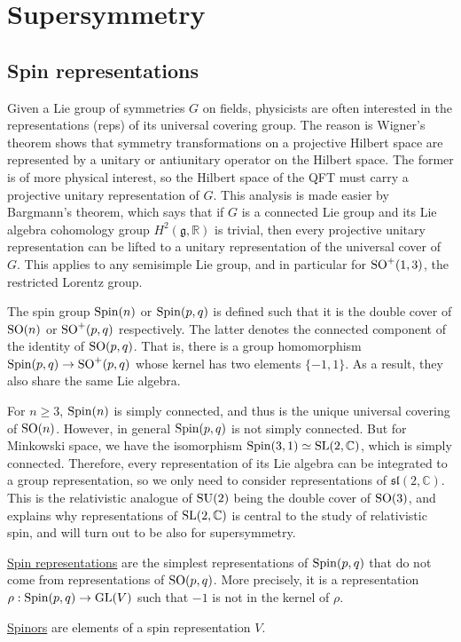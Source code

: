\chapter{Supersymmetry} 
\label{appendix3}
\section{Spin representations}
Given a Lie group of symmetries $G$ on fields, physicists are often interested in the 
representations (reps) of its universal covering group. The reason is 
Wigner's theorem shows that symmetry transformations on a projective Hilbert space are
represented by a unitary or antiunitary operator on the Hilbert space. The
former is of more physical interest, so the Hilbert
space of the QFT must carry a projective unitary representation of $G$. 
This analysis is made easier by
Bargmann's theorem, which says that if $G$ is a connected 
Lie group and its Lie algebra cohomology group
$H^2(\mathfrak{g},\mathbb{R})$ is trivial, then every projective unitary
representation can be lifted to a unitary representation of the universal cover
of $G$.\cite[Theorem 4.8]{cft} This applies to any semisimple Lie
group, and in particular for $\operatorname{SO}^+(1,3)$, the restricted
Lorentz group. 

The spin group $\operatorname{Spin}(n)$ or $\operatorname{Spin}(p,q)$ is defined such that it is the double cover of
$\operatorname{SO}(n)$ or $\operatorname{SO}^+(p,q)$ respectively. 
The latter denotes the connected component of the identity of $\operatorname{SO}(p,q)$. 
That is, there is a group homomorphism $\operatorname{Spin}(p,q) \to \operatorname{SO}^+(p,q)$ whose kernel
has two elements $\{-1,1\}$. 
As a result, they also share the same Lie algebra.

For $n\geq 3$,
$\operatorname{Spin}(n)$ is simply connected, and thus is the unique universal covering 
of $\operatorname{SO}(n)$. However, in general $\operatorname{Spin}(p,q)$ is not simply connected. 
But for Minkowski space, we have the isomorphism $\operatorname{Spin}(3,1) \simeq
\operatorname{SL}(2,\mathbb{C})$, which is simply connected. 
Therefore, every representation of its Lie algebra can be integrated to a group
representation, so we only need to consider representations of
$\mathfrak{sl}(2,\mathbb{C})$.\cite[Theorem 5.6]{hall} 
This is the relativistic analogue of $\operatorname{SU}(2)$ being the double cover of  $\operatorname{SO}(3)$,
and explains why representations of $\operatorname{SL}(2,\mathbb{C})$ is central to the study
of relativistic spin, and will turn out to be also for supersymmetry. 

\begin{defn}
	\underline{Spin representations} are the simplest representations of 
	$\operatorname{Spin}(p,q)$ that do not come from representations of  $\operatorname{SO}(p,q)$. 
	More precisely, it is a representation $\rho : \operatorname{Spin}(p,q) \to \operatorname{GL}(V)$ such 
	that $-1$ is not in the kernel of $\rho$.

\underline{Spinors} are elements of a spin representation $V$.
\end{defn}

